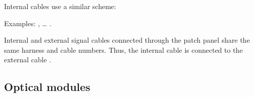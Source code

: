 Internal cables use a similar scheme:
\begin{center}
\end{center}
\par\noindent Examples: , \dots
{}.

Internal and external signal cables  connected through the patch panel
share the  same harness  and cable numbers.  Thus, the  internal cable
   is   connected    to   the   external   cable
.


\subsection{Optical modules}



